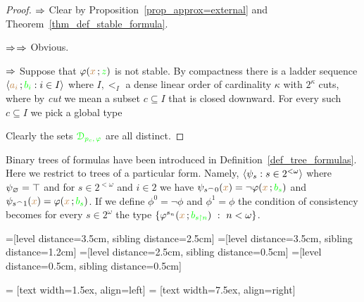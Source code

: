  \begin{proof}
 $\Rightarrow$ Clear by Proposition~\ref{prop_approx=external} and Theorem~\ref{thm_def_stable_formula}.
 
 $\Rightarrow$$\Rightarrow$ Obvious.
 
 $\Rightarrow$ Suppose that $\varphi({\color{brown} x}\,;{\color{green} z})$ is not stable.
 By compactness there is a ladder sequence  $\langle{\color{brown}a_i}\,;{\color{green} b_i} : i\in I\rangle$ where $I,<_I$ a dense linear order of cardinality $\kappa$ with $2^\kappa$ cuts, where by \textit{cut\/} we mean a subset $c\subseteq I$ that is closed downward.
 For every such $c\subseteq I$ we pick a global type
 
 
 Clearly the sets ${\color{green}\EuScript D_{p_c,\,\varphi} }$ are all distinct.
 \end{proof}


Binary trees of formulas have been introduced in Definition~\ref{def_tree_formulas}.
Here we restrict to trees of a particular form.
Namely, $\langle\psi_s:s\in 2^{<\omega}\rangle$  where $\psi_\varnothing=\top$ and for $s\in 2^{<\omega}$ and $i\in 2$ we have $\psi_{s^\frown 0}({\color{brown} x})=\neg\varphi({\color{brown} x}\,;{\color{green} b_s})$ and $\psi_{s^\frown 1}({\color{brown} x})=\varphi({\color{brown} x}\,;{\color{green} b_s})$.
If we define $\phi^0=\neg\phi$ and $\phi^1=\phi$ the condition of consistency becomes for every $s\in 2^\omega$ the type $\{\varphi^{s_n}({\color{brown} x}\,;{\color{green} b_{s\restriction n}})\ :\ n<\omega\}$.


=[level distance=3.5cm, sibling distance=2.5cm]
=[level distance=3.5cm, sibling distance=1.2cm]
=[level distance=2.5cm, sibling distance=0.5cm]
=[level distance=0.5cm, sibling distance=0.5cm]

 = [text width=1.5ex, align=left]
 = [text width=7.5ex, align=right]

\def\leaf{...}

